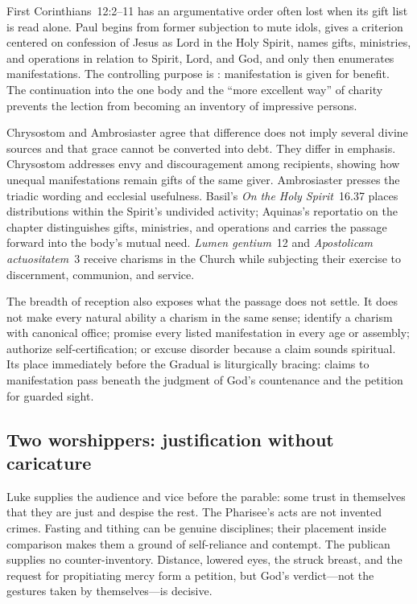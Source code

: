 First Corinthians~12:2--11 has an argumentative order often lost when its gift
list is read alone. Paul begins from former subjection to mute idols, gives a
criterion centered on confession of Jesus as Lord in the Holy Spirit, names
gifts, ministries, and operations in relation to Spirit, Lord, and God, and
only then enumerates manifestations. The controlling purpose is
: manifestation is given for benefit. The continuation
into the one body and the ``more excellent way'' of charity prevents the
lection from becoming an inventory of impressive persons.

Chrysostom and Ambrosiaster agree that difference does not imply several
divine sources and that grace cannot be converted into debt. They differ in
emphasis. Chrysostom addresses envy and discouragement among recipients,
showing how unequal manifestations remain gifts of the same giver.
Ambrosiaster presses the triadic wording and ecclesial usefulness. Basil's
\emph{On the Holy Spirit}~16.37 places distributions within the Spirit's
undivided activity; Aquinas's reportatio on the chapter distinguishes gifts,
ministries, and operations and carries the passage forward into the body's
mutual need. \emph{Lumen gentium}~12 and \emph{Apostolicam
actuositatem}~3 receive charisms in the Church while subjecting their exercise
to discernment, communion, and service.

The breadth of reception also exposes what the passage does not settle. It
does not make every natural ability a charism in the same sense; identify a
charism with canonical office; promise every listed manifestation in every
age or assembly; authorize self-certification; or excuse disorder because a
claim sounds spiritual. Its place immediately before the Gradual is
liturgically bracing: claims to manifestation pass beneath the judgment of
God's countenance and the petition for guarded sight.

\subsection*{Two worshippers: justification without caricature\enspace{}}

Luke supplies the audience and vice before the parable: some trust in
themselves that they are just and despise the rest. The Pharisee's acts are
not invented crimes. Fasting and tithing can be genuine disciplines; their
placement inside comparison makes them a ground of self-reliance and
contempt. The publican supplies no counter-inventory. Distance, lowered eyes,
the struck breast, and the request for propitiating mercy form a petition, but
God's verdict---not the gestures taken by themselves---is decisive.

